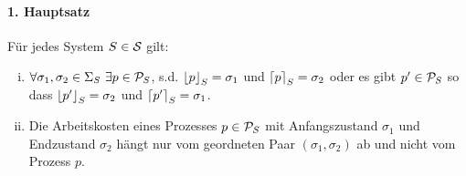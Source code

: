 

\paragraph{1. Hauptsatz}
Für jedes System $S \in \S$ gilt:
\begin{enumerate}[(i)]
    \item  $\forall \sigma_1 , \sigma_2 \in \Sigma_S \ \exists
        p \in \P_S$, s.d.
        $\floor{p}_S = \sigma_1$ und $\ceil{p}_S = \sigma_2$ oder es gibt
        $p' \in \P_S$ so dass $\floor{p'}_S = \sigma_2$ und $\ceil{p'}_S =
        \sigma_1$.
    \item Die Arbeitskosten eines Prozesses $p \in \P_S$ mit Anfangszustand
        $\sigma_1$ und Endzustand $\sigma_2$ hängt nur vom geordneten Paar
        $(\sigma_1,\sigma_2)$ ab und nicht vom Prozess $p$.
\end{enumerate}




